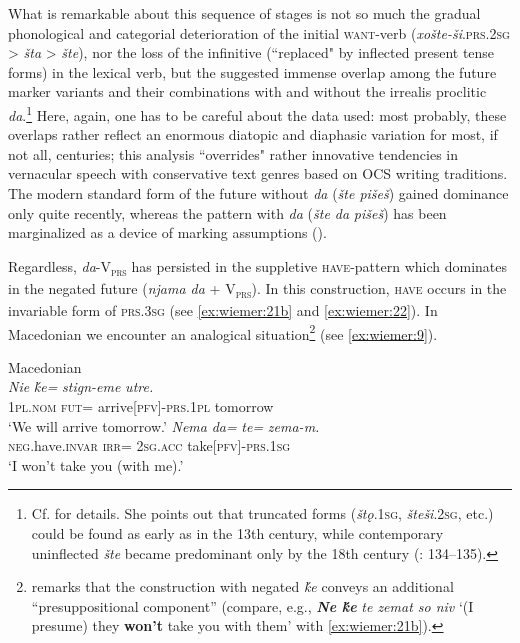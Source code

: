 \documentclass[output=paper,colorlinks,citecolor=brown]{langscibook}
\begin{document}
What is remarkable about this sequence of stages is not so much the gradual phonological and categorial deterioration of the initial \textsc{want}-verb (\textit{xošte-ši}.\textsc{prs.2sg} > \textit{šta} > \textit{šte}), nor the loss of the infinitive (``replaced" by inflected present tense forms) in the lexical verb, but the suggested immense overlap among the future marker variants and their combinations with and without the irrealis proclitic \textit{da}.\footnote{Cf. \citet[134 and passim]{Ivanova-Mirčeva1962} for details. She points out that truncated forms (\textit{štǫ}.\textsc{1sg}, \textit{šteši}.\textsc{2sg}, etc.) could be found as early as in the 13th century, while contemporary uninflected \textit{šte} became predominant only by the 18th century (\citeyear{Ivanova-Mirčeva1962}: 134--135).} Here, again, one has to be careful about the data used: most probably, these overlaps rather reflect an enormous diatopic and diaphasic variation for most, if not all, centuries; this analysis ``overrides" rather innovative tendencies in vernacular speech with conservative text genres based on OCS writing traditions. The modern standard form of the future without \textit{da} (\textit{šte pišeš}) gained dominance only quite recently, whereas the pattern with \textit{da} (\textit{šte da }\textit{pišeš}) has been marginalized as a device of marking assumptions (\cite{asenova_guentcheva_2022}).

Regardless, \textit{da}-V\textsubscript{\textsc{prs}} has persisted in the suppletive \textsc{have}-pattern which dominates in the negated future (\textit{njama da} + V\textsubscript{\textsc{prs}}). In this construction, \textsc{have} occurs in the invariable form of \textsc{prs.3sg} (see \ref{ex:wiemer:21b} and \ref{ex:wiemer:22}). In Macedonian we encounter an analogical situation\footnote{\citet[388]{Tomić2012} remarks that the construction with negated \textit{ḱe }conveys an additional “presuppositional component” (compare, e.g., \textbf{\textit{Ne} \textit{ḱe}}\textit{ te zemat so niv }‘(I presume) they \textbf{won’t} take you with them’ with \ref{ex:wiemer:21b}).} (see \ref{ex:wiemer:9}). 

\ea Macedonian \label{ex:wiemer:21}\\
    \ea \label{ex:wiemer:21a}
    \gll \textit{Nie} \textit{ḱe=} \textit{stign-eme} \textit{utre.}\\
         1\textsc{pl.nom} \textsc{fut=} arrive[\textsc{pfv}]-\textsc{prs.1pl} tomorrow\\
    \glt ‘We will arrive tomorrow.’
    \ex \label{ex:wiemer:21b}
    \gll \textit{Nema} \textit{da=} \textit{te=} \textit{zema-m.}\\
         \textsc{neg}.have.\textsc{invar} \textsc{irr=} 2\textsc{sg.acc} take[\textsc{pfv}]-\textsc{prs.1sg}\\
    \glt ‘I won’t take you (with me).’
    \z
\z
\end{document}
